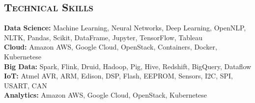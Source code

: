 \begin{resume}
\section{\textsc{Technical Skills}}
{\bf Data Science:} Machine Learning, Neural Networks, Deep Learning, OpenNLP, NLTK, Pandas, Scikit, DataFrame, Jupyter, TensorFlow, Tableau \\
{\bf Cloud:} Amazon AWS, Google Cloud, OpenStack, Containers, Docker, Kubernetese \\
{\bf Big Data:} Spark, Flink, Druid, Hadoop, Pig, Hive, Redshift, BigQuery, Dataflow \\
{\bf IoT:} Atmel AVR, ARM, Edison, DSP, Flash, EEPROM, Sensors, I2C, SPI, USART, CAN \\
{\bf Analytics:} Amazon AWS, Google Cloud, OpenStack, Kubernetese





\end{resume}
